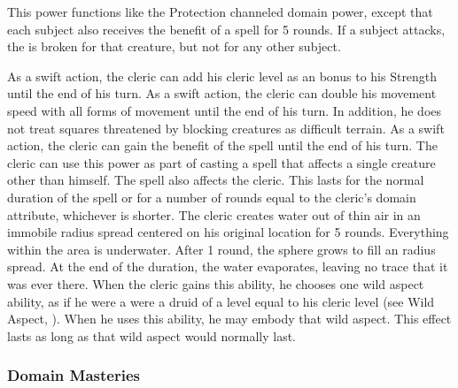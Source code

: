  This power functions like the Protection channeled domain power, except that each subject also receives the benefit of a 
spell for 5 rounds.
If a subject attacks, the  is broken for that creature, but not for any other subject.

As a swift action, the cleric can add his cleric level as an bonus to his Strength until the end of his turn.
As a swift action, the cleric can double his movement speed with all forms of movement until the end of his turn.
In addition, he does not treat squares threatened by blocking creatures as difficult terrain.
 As a swift action, the cleric can gain the benefit of the 
spell until the end of his turn.
The cleric can use this power as part of casting a spell that affects a single creature other than himself.
The spell also affects the cleric.
This lasts for the normal duration of the spell or for a number of rounds equal to the cleric's domain attribute, whichever is shorter.
The cleric creates water out of thin air in an immobile \areamed radius spread centered on his original location for 5 rounds.
Everything within the area is underwater.
After 1 round, the sphere grows to fill an \arealarge radius spread.
At the end of the duration, the water evaporates, leaving no trace that it was ever there.
When the cleric gains this ability, he chooses one wild aspect ability, as if he were a were a druid of a level equal to his cleric level (see Wild Aspect, ).
When he uses this ability, he may embody that wild aspect.
This effect lasts as long as that wild aspect would normally last.

\subsubsection{Domain Masteries}\label{Domain Masteries}

